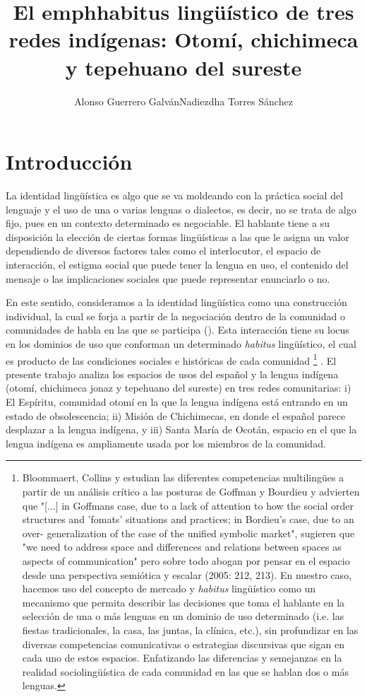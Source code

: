 \documentclass[output=paper]{../langscibook}
\author{Alonso Guerrero Galván\affiliation{}\orcid{}\lastand Nadiezdha Torres Sánchez\affiliation{}\orcid{}}
\title{El emph{habitus} lingüístico de tres redes indígenas: Otomí, chichimeca y tepehuano del sureste}
\begin{document}
\maketitle 
{}%


 \section{Introducción}


La identidad lingüística es algo que se va moldeando con la práctica social del lenguaje y el uso de una o varias lenguas o dialectos, es decir, no se trata de algo fijo, pues en un contexto determinado es negociable. El hablante tiene a su disposición la elección de ciertas formas lingüísticas a las que le asigna un valor dependiendo de diversos factores tales como el interlocutor, el espacio de interacción, el estigma social que puede tener la lengua en uso, el contenido del mensaje o las implicaciones sociales que puede representar enunciarlo o no.

En este sentido, consideramos a la identidad lingüística como una construcción individual, la cual se forja a partir de la negociación dentro de la comunidad o comunidades de habla en las que se participa (\citealt{Niño-MurciaRothman2008}). Esta interacción tiene su locus en los dominios de uso que conforman un determinado \textit{habitus} lingüístico, el cual es producto de las condiciones sociales e históricas de cada comunidad \citep{Bourdieu1990}\footnote{Bloommaert, Collins y \citet[210]{Slembrouck2005} estudian las diferentes competencias multilingües a partir de un análisis crítico a las posturas de Goffman y Bourdieu y advierten que "[...] in Goffmans case, due to a lack of attention to how the social order structures and 'fomats' situations and practices; in Bordieu's case, due to an over- generalization of the case of the unified symbolic market", sugieren que "we need to address space and differences and relations between spaces as aspects of communication" pero sobre todo abogan por pensar en el espacio desde una perspectiva semiótica y escalar (2005: 212, 213). En nuestro caso, hacemos uso del concepto de mercado y \textit{habitus} lingüístico como un mecanismo que permita describir las decisiones que toma el hablante en la selección de una o más lenguas en un dominio de uso determinado (i.e. las fiestas tradicionales, la casa, las juntas, la clínica, etc.), sin profundizar en las diversas competencias comunicativas o estrategias discursivas que sigan en cada uno de estos espacios. Enfatizando las diferencias y semejanzas en la realidad sociolingüística de cada comunidad en las que se hablan dos o más lenguas.} . El presente trabajo analiza los espacios de usos del español y la lengua indígena (otomí, chichimeca jonaz y tepehuano del sureste) en tres redes comunitarias: i) El Espíritu, comunidad otomí en la que la lengua indígena está entrando en un estado de obsolescencia; ii) Misión de Chichimecas, en donde el español parece desplazar a la lengua indígena, y iii) Santa María de Ocotán, espacio en el que la lengua indígena es ampliamente usada por los miembros de la comunidad.
\end{document}
